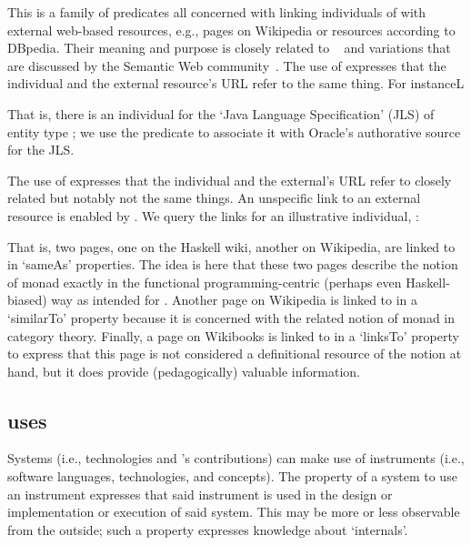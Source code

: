 This is a family of predicates all concerned with linking individuals
of \solasote{} with external web-based resources, e.g., pages on
Wikipedia or resources according to DBpedia. Their meaning and purpose
is closely related to ~\cite{owl} and variations that
are discussed by the Semantic Web community~\cite{HalpinHT11}. The use
of  expresses that the \solasote{} individual and the
external resource's URL refer to the same thing. For instanceL


\noindent
That is, there is an \solasote{} individual for the `Java Language
Specification' (JLS) of entity type ; we use the
 predicate to associate it with Oracle's authorative
source for the JLS.

The use of  expresses that the \solasote{}
individual and the external's URL refer to closely related but notably
not the same things. An unspecific link to an external resource is
enabled by . We query the links for an illustrative
individual, :



\noindent
That is, two pages, one on the Haskell wiki, another on Wikipedia, are
linked to in `sameAs' properties. The idea is here that these two
pages describe the notion of monad exactly in the functional
programming-centric (perhaps even Haskell-biased) way as intended for
\solasote. Another page on Wikipedia is linked to in a `similarTo'
property because it is concerned with the related notion of monad in
category theory. Finally, a page on Wikibooks is linked to in a
`linksTo' property to express that this page is not considered a
definitional resource of the notion at hand, but it does provide
(pedagogically) valuable information.


\subsection{uses} 
\label{S:uses}

Systems (i.e., technologies and \ooo{}'s contributions) can make use
of instruments (i.e., software languages, technologies, and
concepts). The property of a system to use an instrument expresses
that said instrument is used in the design or implementation or
execution of said system. This may be more or less observable from the
outside; such a property expresses knowledge about `internals'.

